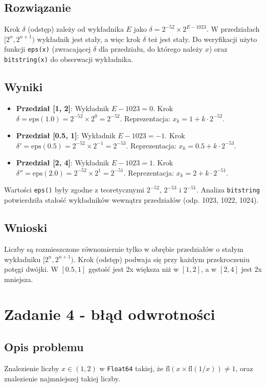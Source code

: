 \documentclass{article}
\begin{document}
\subsection{Rozwiązanie}
Krok $\delta$ (odstęp) zależy od wykładnika $E$ jako $\delta = 2^{-52} \times 2^{E-1023}$. W przedziałach $[2^n, 2^{n+1})$ wykładnik jest stały, a więc krok $\delta$ też jest stały. Do weryfikacji użyto funkcji \texttt{eps(x)} (zwracającej $\delta$ dla przedziału, do którego należy $x$) oraz \texttt{bitstring(x)} do obserwacji wykładnika.

\subsection{Wyniki}
\begin{itemize}
    \item \textbf{Przedział [1, 2]}: Wykładnik $E-1023=0$. Krok $\delta = \text{eps}(1.0) = 2^{-52} \times 2^0 = 2^{-52}$. Reprezentacja: $x_k = 1 + k \cdot 2^{-52}$.
    \item \textbf{Przedział [0.5, 1]}: Wykładnik $E-1023=-1$. Krok $\delta' = \text{eps}(0.5) = 2^{-52} \times 2^{-1} = 2^{-53}$. Reprezentacja: $x_k = 0.5 + k \cdot 2^{-53}$.
    \item \textbf{Przedział [2, 4]}: Wykładnik $E-1023=1$. Krok $\delta'' = \text{eps}(2.0) = 2^{-52} \times 2^1 = 2^{-51}$. Reprezentacja: $x_k = 2 + k \cdot 2^{-51}$.
\end{itemize}
Wartości \texttt{eps()} były zgodne z teoretycznymi $2^{-52}$, $2^{-53}$ i $2^{-51}$. Analiza \texttt{bitstring} potwierdziła stałość wykładników wewnątrz przedziałów (odp. 1023, 1022, 1024).

\subsection{Wnioski}
Liczby są rozmieszczone równomiernie tylko w obrębie przedziałów o stałym wykładniku $[2^n, 2^{n+1})$. Krok (odstęp) podwaja się przy każdym przekroczeniu potęgi dwójki. W $[0.5, 1]$ gęstość jest 2x większa niż w $[1, 2]$, a w $[2, 4]$ jest 2x mniejsza.

\section{Zadanie 4 - błąd odwrotności}
\subsection{Opis problemu}
Znalezienie liczby $x \in (1, 2)$ w \texttt{Float64} takiej, że $\text{fl}(x \times \text{fl}(1/x)) \neq 1$, oraz znalezienie najmniejszej takiej liczby.
\end{document}
